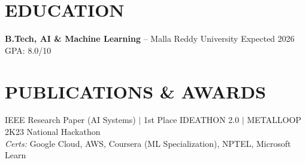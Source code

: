 \documentclass[10pt]{article}
\begin{document}
\section*{EDUCATION}
\textbf{B.Tech, AI \& Machine Learning} -- Malla Reddy University \hfill Expected 2026 \hfill GPA: 8.0/10

\section*{PUBLICATIONS \& AWARDS}
IEEE Research Paper (AI Systems) $|$ 1st Place IDEATHON 2.0 $|$ METALLOOP 2K23 National Hackathon \\
\textit{Certs:} Google Cloud, AWS, Coursera (ML Specialization), NPTEL, Microsoft Learn
\end{document}
